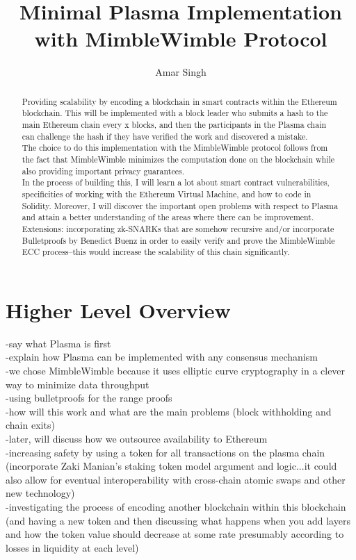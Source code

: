 \documentclass{amsart}
\author{Amar Singh}
\theoremstyle{definition}
\numberwithin{equation}{section}
\begin{document}
\title{Minimal Plasma Implementation with MimbleWimble Protocol}
\maketitle
\begin{abstract}
Providing scalability by encoding a blockchain in smart contracts within the Ethereum blockchain. This will be implemented with a block leader who submits a hash to the main Ethereum chain every x blocks, and then the participants in the Plasma chain can challenge the hash if they have verified the work and discovered a mistake.\\

The choice to do this implementation with the MimbleWimble protocol follows from the fact that MimbleWimble minimizes the computation done on the blockchain while also providing important privacy guarantees.\\

In the process of building this, I will learn a lot about smart contract vulnerabilities, specificities of working with the Ethereum Virtual Machine, and how to code in Solidity. Moreover, I will discover the important open problems with respect to Plasma and attain a better understanding of the areas where there can be improvement.\\

Extensions: incorporating zk-SNARKs that are somehow recursive and/or incorporate Bulletproofs by Benedict Buenz in order to easily verify and prove the MimbleWimble ECC process--this would increase the scalability of this chain significantly.\\
\end{abstract}
\tableofcontents

\section{Higher Level Overview}
-say what Plasma is first \cite{1}\\
-explain how Plasma can be implemented with any consensus mechanism\\
-we chose MimbleWimble because it uses elliptic curve cryptography in a clever way to minimize data throughput\\
-using bulletproofs for the range proofs\\
-how will this work and what are the main problems (block withholding and chain exits)\\
-later, will discuss how we outsource availability to Ethereum\\
-increasing safety by using a token for all transactions on the plasma chain (incorporate Zaki Manian's staking token model argument and logic...it could also allow for eventual interoperability with cross-chain atomic swaps and other new technology)\\
-investigating the process of encoding another blockchain within this blockchain (and having a new token and then discussing what happens when you add layers and how the token value should decrease at some rate presumably according to losses in liquidity at each level)\\
\end{document}

